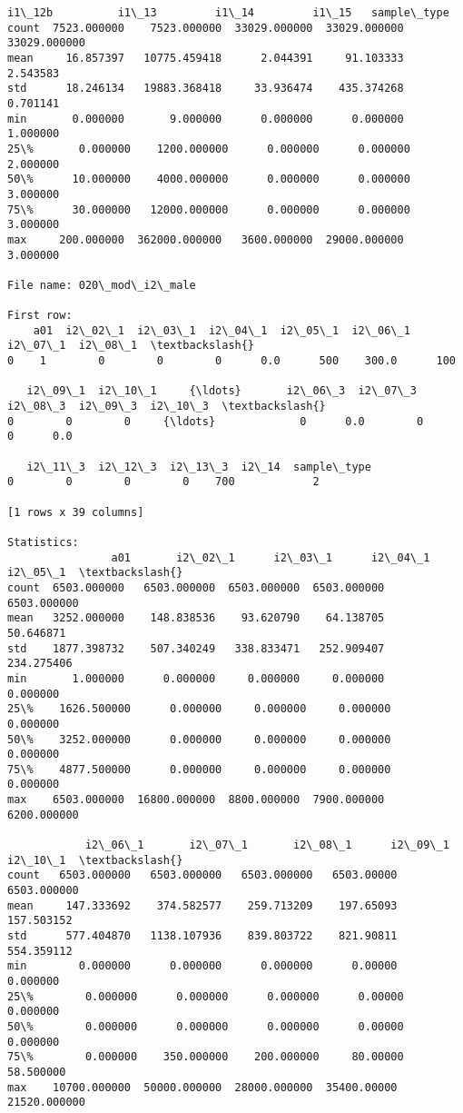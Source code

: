 \documentclass[11pt]{article}
\begin{document}
\begin{Verbatim}[commandchars=\\\{\}]
            i1\_12b          i1\_13         i1\_14         i1\_15   sample\_type  
count  7523.000000    7523.000000  33029.000000  33029.000000  33029.000000  
mean     16.857397   10775.459418      2.044391     91.103333      2.543583  
std      18.246134   19883.368418     33.936474    435.374268      0.701141  
min       0.000000       9.000000      0.000000      0.000000      1.000000  
25\%       0.000000    1200.000000      0.000000      0.000000      2.000000  
50\%      10.000000    4000.000000      0.000000      0.000000      3.000000  
75\%      30.000000   12000.000000      0.000000      0.000000      3.000000  
max     200.000000  362000.000000   3600.000000  29000.000000      3.000000  

File name: 020\_mod\_i2\_male

First row: 
    a01  i2\_02\_1  i2\_03\_1  i2\_04\_1  i2\_05\_1  i2\_06\_1  i2\_07\_1  i2\_08\_1  \textbackslash{}
0    1        0        0        0      0.0      500    300.0      100   

   i2\_09\_1  i2\_10\_1     {\ldots}       i2\_06\_3  i2\_07\_3  i2\_08\_3  i2\_09\_3  i2\_10\_3  \textbackslash{}
0        0        0     {\ldots}             0      0.0        0        0      0.0   

   i2\_11\_3  i2\_12\_3  i2\_13\_3  i2\_14  sample\_type  
0        0        0        0    700            2  

[1 rows x 39 columns]

Statistics: 
                a01       i2\_02\_1      i2\_03\_1      i2\_04\_1      i2\_05\_1  \textbackslash{}
count  6503.000000   6503.000000  6503.000000  6503.000000  6503.000000   
mean   3252.000000    148.838536    93.620790    64.138705    50.646871   
std    1877.398732    507.340249   338.833471   252.909407   234.275406   
min       1.000000      0.000000     0.000000     0.000000     0.000000   
25\%    1626.500000      0.000000     0.000000     0.000000     0.000000   
50\%    3252.000000      0.000000     0.000000     0.000000     0.000000   
75\%    4877.500000      0.000000     0.000000     0.000000     0.000000   
max    6503.000000  16800.000000  8800.000000  7900.000000  6200.000000   

            i2\_06\_1       i2\_07\_1       i2\_08\_1      i2\_09\_1       i2\_10\_1  \textbackslash{}
count   6503.000000   6503.000000   6503.000000   6503.00000   6503.000000   
mean     147.333692    374.582577    259.713209    197.65093    157.503152   
std      577.404870   1138.107936    839.803722    821.90811    554.359112   
min        0.000000      0.000000      0.000000      0.00000      0.000000   
25\%        0.000000      0.000000      0.000000      0.00000      0.000000   
50\%        0.000000      0.000000      0.000000      0.00000      0.000000   
75\%        0.000000    350.000000    200.000000     80.00000     58.500000   
max    10700.000000  50000.000000  28000.000000  35400.00000  21520.000000   


\end{Verbatim}
\end{document}
